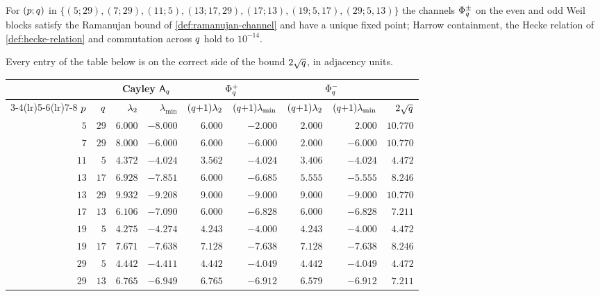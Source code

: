 \begin{numerical}
\label{num:weil-lps-ramanujan}
For $(p;q)$ in $\{(5;29),(7;29),(11;5),(13;17,29),(17;13),(19;5,17),(29;5,13)\}$
the channels $\Phi_{q}^{\pm}$ on the even and odd Weil blocks satisfy the
Ramanujan bound of \cref{def:ramanujan-channel} and have a unique fixed point;
Harrow containment, the Hecke relation of \cref{def:hecke-relation} and
commutation across $q$ hold to $10^{-14}$.
\end{numerical}

Every entry of the table below is on the correct side of the bound
$2\sqrt{q}$, in adjacency units.

\begin{center}
\footnotesize
\begin{tabular}{rr rr rr rr r}
\toprule
& & \multicolumn{2}{c}{Cayley $\mathsf A_{q}$}
  & \multicolumn{2}{c}{$\Phi_{q}^{+}$}
  & \multicolumn{2}{c}{$\Phi_{q}^{-}$} & \\
\cmidrule(lr){3-4}\cmidrule(lr){5-6}\cmidrule(lr){7-8}
$p$ & $q$ & $\lambda_2$ & $\lambda_{\min}$
  & $(q{+}1)\lambda_2$ & $(q{+}1)\lambda_{\min}$
  & $(q{+}1)\lambda_2$ & $(q{+}1)\lambda_{\min}$ & $2\sqrt{q}$ \\
\midrule
$5$  & $29$ & $6.000$ & $-8.000$ & $6.000$ & $-2.000$ & $2.000$ & $2.000$ & $10.770$ \\
$7$  & $29$ & $8.000$ & $-6.000$ & $6.000$ & $-6.000$ & $2.000$ & $-6.000$ & $10.770$ \\
$11$ & $5$  & $4.372$ & $-4.024$ & $3.562$ & $-4.024$ & $3.406$ & $-4.024$ & $4.472$ \\
$13$ & $17$ & $6.928$ & $-7.851$ & $6.000$ & $-6.685$ & $5.555$ & $-5.555$ & $8.246$ \\
$13$ & $29$ & $9.932$ & $-9.208$ & $9.000$ & $-9.000$ & $9.000$ & $-9.000$ & $10.770$ \\
$17$ & $13$ & $6.106$ & $-7.090$ & $6.000$ & $-6.828$ & $6.000$ & $-6.828$ & $7.211$ \\
$19$ & $5$  & $4.275$ & $-4.274$ & $4.243$ & $-4.000$ & $4.243$ & $-4.000$ & $4.472$ \\
$19$ & $17$ & $7.671$ & $-7.638$ & $7.128$ & $-7.638$ & $7.128$ & $-7.638$ & $8.246$ \\
$29$ & $5$  & $4.442$ & $-4.411$ & $4.442$ & $-4.049$ & $4.442$ & $-4.049$ & $4.472$ \\
$29$ & $13$ & $6.765$ & $-6.949$ & $6.765$ & $-6.912$ & $6.579$ & $-6.912$ & $7.211$ \\
\bottomrule
\end{tabular}
\end{center}

